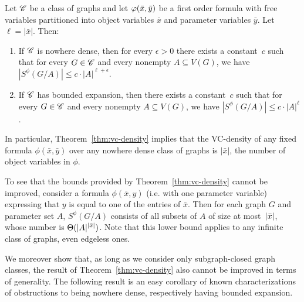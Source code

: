  \setcounter{vcupper}{\value{theorem}}
 
 \begin{theorem}\label{thm:vc-density}
Let $\mathscr{C}$ be a class of graphs and let $\varphi(\bar{x},\bar{y})$ be a first order formula
with free variables  partitioned  into object variables $\bar x$  and parameter variables $\bar y$. Let $\ell=|\bar x|$. Then:
\begin{enumerate}
\item If $\mathscr{C}$ is nowhere dense, then for every $\epsilon>0$ 
there exists a constant~$c$ such that for every $G\in \mathscr{C}$ and every nonempty
$A\subseteq V(G)$, we have $|S^\phi(G/A)|\leq c\cdot |A|^{\ell+\epsilon}.$
\item If $\mathscr{C}$ has bounded expansion, then there exists a constant~$c$ such that for every $G\in \mathscr{C}$ and every nonempty $A\subseteq V(G)$, we have $|S^\phi(G/A)|\leq c\cdot |A|^\ell$.
\end{enumerate}
 \end{theorem}

In particular, Theorem~\ref{thm:vc-density} implies that
the VC-density of any fixed formula 
$\phi(\bar x,\bar y)$ over any nowhere dense class of graphs is $|\bar x|$, the number of object variables in $\phi$.

To see that the bounds provided by Theorem~\ref{thm:vc-density} cannot be improved, consider a formula $\phi(\bar x,y)$ (i.e. with one parameter variable) expressing that $y$ is equal to one of the entries of 
$\bar x$. Then for each graph $G$ and parameter set $A$, $S^{\phi}(G/A)$ consists of all subsets of $A$ of size at most~$|\bar{x}|$, whose number is $\Theta(|A|^{|\bar{x}|})$. Note that
this lower bound applies to any infinite class of graphs, even edgeless ones.

We moreover show that, as long as we consider only subgraph-closed graph classes, the result of Theorem~\ref{thm:vc-density} also cannot be improved in terms of generality.
The following result is an easy corollary of known characterizations of obstructions to being nowhere dense, respectively having bounded expansion.

\pagebreak

